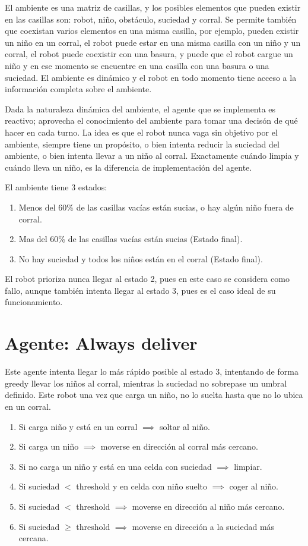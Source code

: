 \documentclass[a4paper, 12pt]{article}
\begin{document}
El ambiente es una matriz de casillas, y los posibles elementos que pueden existir
en las casillas son: robot, niño, obst\'aculo, suciedad y corral. Se permite tambi\'en que coexistan
varios elementos en una misma casilla, por ejemplo, pueden existir un niño en un corral, el robot puede
estar en una misma casilla con un niño y un corral, el robot puede coexistir con una basura, y puede que el
robot cargue un niño y en ese momento se encuentre en una casilla con una basura o una suciedad. El ambiente
es din\'amico y el robot en todo momento tiene acceso a la informaci\'on completa sobre el ambiente.

Dada la naturaleza din\'amica del ambiente, el agente que se implementa es reactivo; aprovecha el conocimiento
del ambiente para tomar una decis\'on de qu\'e hacer en cada turno. La idea es que el robot nunca vaga sin objetivo
por el ambiente, siempre tiene un prop\'osito, o bien intenta reducir la suciedad del ambiente, o bien intenta llevar a un niño
al corral. Exactamente cu\'ando limpia y cu\'ando lleva un niño, es la diferencia de implementaci\'on del agente.

El ambiente tiene 3 estados:
\begin{enumerate}
  \item Menos del 60\% de las casillas vac\'ias est\'an sucias, o hay alg\'un niño fuera de corral.
  \item Mas del 60\% de las casillas vac\'ias est\'an sucias (Estado final).
  \item No hay suciedad y todos los niños est\'an en el corral (Estado final). 
\end{enumerate}

El robot prioriza nunca llegar al estado 2, pues en este caso se considera como fallo, aunque tambi\'en intenta llegar
al estado 3, pues es el caso ideal de su funcionamiento.

\section*{Agente: Always deliver}
Este agente intenta llegar lo m\'as r\'apido posible al estado 3, intentando de forma greedy llevar los niños al corral,
mientras la suciedad no sobrepase un umbral definido. Este robot una vez que carga un niño, no lo suelta hasta que no lo
ubica en un corral.
\begin{enumerate}
  \item Si carga niño y est\'a en un corral $\implies$ soltar al niño.
  \item Si carga un niño $\implies$ moverse en direcci\'on al corral m\'as cercano.
  \item Si no carga un niño y est\'a en una celda con suciedad $\implies$ limpiar.
  \item Si suciedad $<$ threshold y en celda con niño suelto $\implies$ coger al niño.
  \item Si suciedad $<$ threshold $\implies$ moverse en direcci\'on al niño m\'as cercano.
  \item Si suciedad $\ge$ threshold $\implies$ moverse en direcci\'on a la suciedad m\'as cercana.
\end{enumerate}
\end{document}
